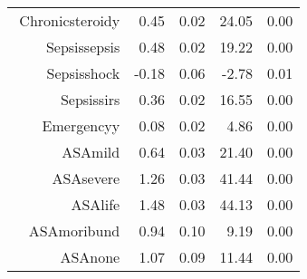 \begin{tabular}{rrrrr}
$$  Chronic\-steroid\-y & 0.45 & 0.02 & 24.05 & 0.00 \\ 
  Sepsis\-sepsis & 0.48 & 0.02 & 19.22 & 0.00 \\ 
  Sepsis\-shock & -0.18 & 0.06 & -2.78 & 0.01 \\ 
  Sepsis\-sirs & 0.36 & 0.02 & 16.55 & 0.00 \\ 
  Emergency\-y & 0.08 & 0.02 & 4.86 & 0.00 \\ 
  ASA\-mild & 0.64 & 0.03 & 21.40 & 0.00 \\ 
  ASA\-severe & 1.26 & 0.03 & 41.44 & 0.00 \\ 
  ASA\-life & 1.48 & 0.03 & 44.13 & 0.00 \\ 
  ASA\-moribund & 0.94 & 0.10 & 9.19 & 0.00 \\ 
  ASA\-none & 1.07 & 0.09 & 11.44 & 0.00 \\ 
   \hline
\end{tabular}

